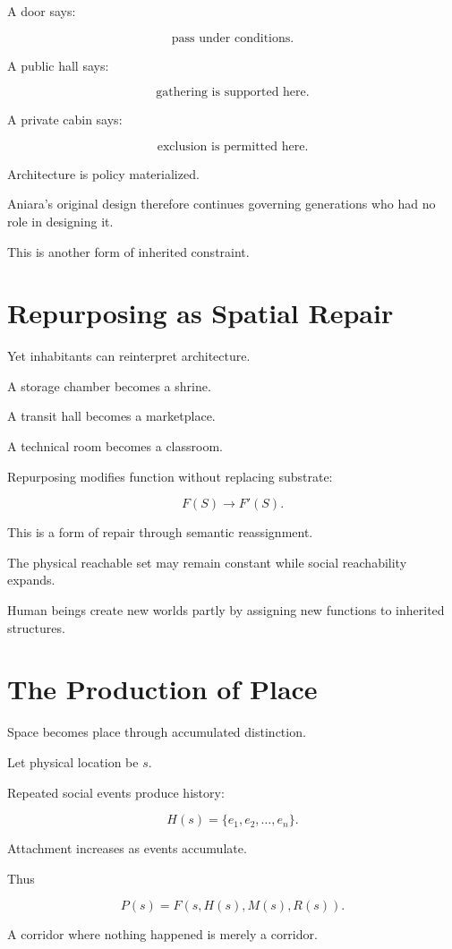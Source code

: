 \documentclass[11pt,oneside]{book}
\theoremstyle{definition}
\theoremstyle{remark}
\begin{document}
A door says:

\[
\text{pass under conditions}.
\]

A public hall says:

\[
\text{gathering is supported here}.
\]

A private cabin says:

\[
\text{exclusion is permitted here}.
\]

Architecture is policy materialized.

Aniara's original design therefore continues governing generations who had no role in designing it.

This is another form of inherited constraint.

\section{Repurposing as Spatial Repair}

Yet inhabitants can reinterpret architecture.

A storage chamber becomes a shrine.

A transit hall becomes a marketplace.

A technical room becomes a classroom.

Repurposing modifies function without replacing substrate:

\[
F(S)
\rightarrow
F'(S).
\]

This is a form of repair through semantic reassignment.

The physical reachable set may remain constant while social reachability expands.

Human beings create new worlds partly by assigning new functions to inherited structures.

\section{The Production of Place}

Space becomes place through accumulated distinction.

Let physical location be \(s\).

Repeated social events produce history:

\[
H(s)
=
\{e_1,e_2,\ldots,e_n\}.
\]

Attachment increases as events accumulate.

Thus

\[
P(s)
=
F(s,H(s),M(s),R(s)).
\]

A corridor where nothing happened is merely a corridor.
\end{document}
